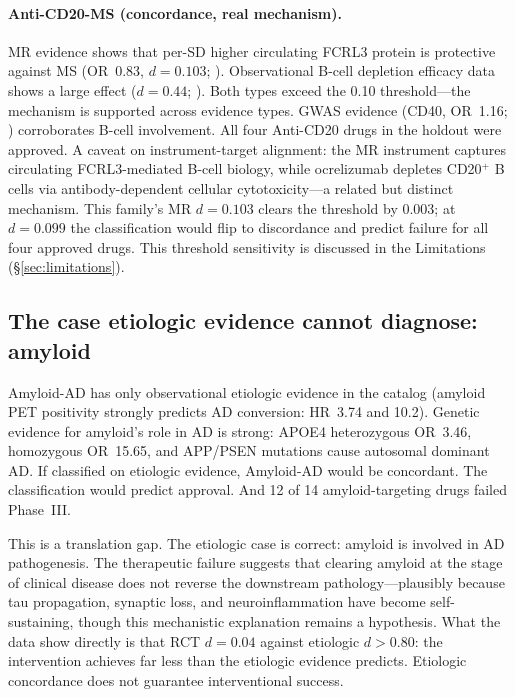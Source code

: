 \documentclass[11pt]{article}
\begin{document}
\paragraph{Anti-CD20-MS (concordance, real mechanism).} MR evidence shows that per-SD higher circulating FCRL3 protein is protective against MS (OR~0.83, $d = 0.103$; \cite{lin2023}). Observational B-cell depletion efficacy data shows a large effect ($d = 0.44$; \cite{hu2019}). Both types exceed the 0.10 threshold---the mechanism is supported across evidence types. GWAS evidence (CD40, OR~1.16; \cite{sokolova2013}) corroborates B-cell involvement. All four Anti-CD20 drugs in the holdout were approved. A caveat on instrument-target alignment: the MR instrument captures circulating FCRL3-mediated B-cell biology, while ocrelizumab depletes CD20$^+$ B cells via antibody-dependent cellular cytotoxicity---a related but distinct mechanism. This family's MR $d = 0.103$ clears the threshold by 0.003; at $d = 0.099$ the classification would flip to discordance and predict failure for all four approved drugs. This threshold sensitivity is discussed in the Limitations (\S\ref{sec:limitations}).

\subsection{The case etiologic evidence cannot diagnose: amyloid}
\label{sec:amyloid}

Amyloid-AD has only observational etiologic evidence in the catalog (amyloid PET positivity strongly predicts AD conversion: HR~3.74 and 10.2). Genetic evidence for amyloid's role in AD is strong: APOE4 heterozygous OR~3.46, homozygous OR~15.65, and APP/PSEN mutations cause autosomal dominant AD. If classified on etiologic evidence, Amyloid-AD would be concordant. The classification would predict approval. And 12 of 14 amyloid-targeting drugs failed Phase~III.

This is a translation gap. The etiologic case is correct: amyloid is involved in AD pathogenesis. The therapeutic failure suggests that clearing amyloid at the stage of clinical disease does not reverse the downstream pathology---plausibly because tau propagation, synaptic loss, and neuroinflammation have become self-sustaining, though this mechanistic explanation remains a hypothesis. What the data show directly is that RCT $d = 0.04$ against etiologic $d > 0.80$: the intervention achieves far less than the etiologic evidence predicts. Etiologic concordance does not guarantee interventional success.
\end{document}
